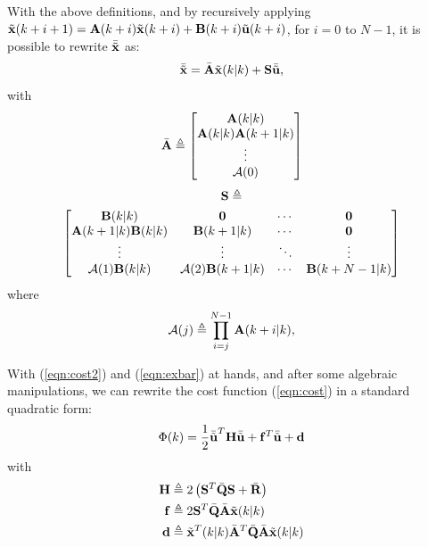 \documentclass[conference]{IEEEtran} %
\begin{document}
With the above definitions, and by recursively applying $\tilde{\bf x}(k+i+1)={\bf A}(k+i)\tilde{\bf x}(k+i)+{\bf B}(k+i)\tilde{\bf u}(k+i)$, for $i=0$ to $N-1$, it is possible to rewrite $\bar{\tilde{\bf x}}$ as:
\begin{equation}\label{eqn:exbar}
	{\bar{\tilde{\bf x}}} = \bar{\bf A}\tilde{\bf x}(k|k)+{\bf S}{\bar{\tilde{\bf u}}},
\end{equation}
with
\begin{equation*}
	\bar{\bf A} \triangleq \begin{bmatrix}
		{\bf A}(k|k) \\ {\bf A}(k|k){\bf A}(k+1|k) \\ \vdots \\ {\cal A}(0)
	\end{bmatrix}
\end{equation*}
{\small
\begin{multline*}
		{\bf S} \triangleq \\ \begin{bmatrix}
			{\bf B}(k|k)		      & {\bf 0} 			    & \cdots & {\bf 0}         \\
			{\bf A}(k+1|k){\bf B}(k|k)& {\bf B}(k+1|k)      	    & \cdots & {\bf 0}         \\
			\vdots			      & \vdots		              & \ddots & \vdots          \\
			{\cal A}(1){\bf B}(k|k)   & {\cal A}(2){\bf B}(k+1|k) & \cdots & {\bf B}(k+N-1|k)
		\end{bmatrix}
\end{multline*}
}
where 
\begin{equation*}
	{\cal A}(j) \triangleq \prod_{i=j}^{N-1}{\bf A}(k+i|k),
\end{equation*}

With (\ref{eqn:cost2}) and (\ref{eqn:exbar}) at hands, and after some algebraic manipulations, we can rewrite the cost function (\ref{eqn:cost}) in a standard quadratic form:
\begin{equation}
	\Phi(k) = \frac{1}{2}{\bar{\tilde{\bf u}}}^T{\bf H}{\bar{\tilde{\bf u}}} + {\bf f}^T{\bar{\tilde{\bf u}}} + {\bf d}
\end{equation}
with
\begin{align*}
	{\bf H} &\triangleq 2\left({\bf S}^T\bar{\bf Q}{\bf S}+\bar{\bf R}\right) \\
	{\bf f} &\triangleq 2{\bf S}^T\bar{\bf Q}\bar{\bf A}\tilde{\bf x}(k|k) \\
	{\bf d} &\triangleq \tilde{\bf x}^T(k|k)\bar{\bf A}^T\bar{\bf Q}\bar{\bf A}\tilde{\bf x}(k|k)
\end{align*}
\end{document}
